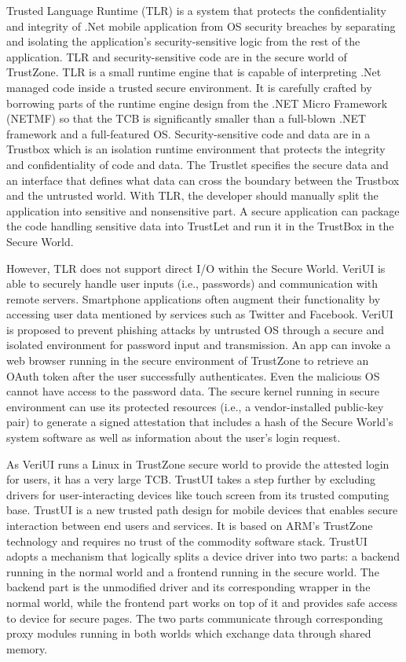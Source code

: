 Trusted Language Runtime (TLR) \cite{TLR} is a system that protects the
confidentiality and integrity of .Net mobile application from OS security
breaches by separating and isolating the application's security-sensitive logic
from the rest of the application. TLR and security-sensitive code are in the
secure world of TrustZone. TLR is a small runtime engine that is capable of
interpreting .Net managed code inside a trusted secure environment. It is
carefully crafted by borrowing parts of the runtime engine design from the .NET
Micro Framework (NETMF) so that the TCB is significantly smaller than a
full-blown .NET framework and a full-featured OS. Security-sensitive code and
data are in a Trustbox which is an isolation runtime environment that protects
the integrity and confidentiality of code and data. The Trustlet specifies the
secure data and an interface that defines what data can cross the boundary
between the Trustbox and the untrusted world. With TLR, the developer should
manually split the application into sensitive and nonsensitive part.  A secure
application can package the code handling sensitive data into TrustLet and run
it in the TrustBox in the Secure World.

However, TLR does not support direct I/O within the Secure World. VeriUI
\cite{VeriUI} is able to securely handle user inputs (i.e., passwords) and
communication with remote servers. Smartphone applications often augment their
functionality by accessing user data mentioned by services such as Twitter and
Facebook. VeriUI is proposed to prevent phishing attacks by untrusted OS
through a secure and isolated environment for password input and transmission.
An app can invoke a web browser running in the secure environment of TrustZone
to retrieve an OAuth token after the user successfully authenticates. Even the
malicious OS cannot have access to the password data.  The secure kernel
running in secure environment can use its protected resources (i.e., a
vendor-installed public-key pair) to generate a signed attestation that
includes a hash of the Secure World's system software as well as information
about the user's login request.

As VeriUI runs a Linux in TrustZone secure world to provide the attested login
for users, it has a very large TCB. TrustUI \cite{TrustUI} takes a step further
by excluding drivers for user-interacting devices like touch screen from its
trusted computing base. TrustUI is a new trusted path design for mobile devices
that enables secure interaction between end users and services. It is based on
ARM's TrustZone technology and requires no trust of the commodity software
stack. TrustUI adopts a mechanism that logically splits a device driver into
two parts: a backend running in the normal world and a frontend running in the
secure world. The backend part is the unmodified driver and its corresponding
wrapper in the normal world, while the frontend part works on top of it and
provides safe access to device for secure pages. The two parts communicate
through corresponding proxy modules running in both worlds which exchange data
through shared memory.
